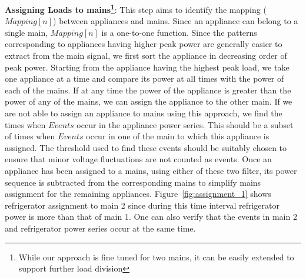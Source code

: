 \documentclass[conference]{IEEEtran}
\newcommand{\figref}[1]{Figure~\ref{#1}}
\begin{document}
\noindent\textbf{Assigning Loads to mains\footnote{While our approach is fine tuned for two mains, it can be easily extended to support further load division}}:
This step aims to identify the mapping ($Mapping[n]$) between appliances and mains. Since an appliance can belong to a single main, $Mapping[n]$ is a one-to-one function. Since the patterns corresponding to appliances having higher peak power are generally easier to extract from the main signal, we first sort the appliance in decreasing order of peak power. Starting from the appliance having the highest peak load, we take one appliance at a time and compare its power at all times with the power of each of the mains. If at any time the power of the appliance is greater than the power of any of the mains, we can assign the appliance to the other main. If we are not able to assign an appliance to mains using this approach, we find the times when $Events$ occur in the appliance power series. This should be a subset of times when $Events$ occur in one of the main to which this appliance is assigned. The threshold used to find these events should be suitably chosen to ensure that minor voltage fluctuations are not counted as events. Once an appliance has been assigned to a mains, using either of these two filter, its power sequence is subtracted from the corresponding mains to simplify mains assignment for the remaining appliances. \figref{fig:assignment_1} shows refrigerator assignment to main 2 since during this time interval refrigerator power is more than that of main 1. One can also verify that the events in main 2 and refrigerator power series occur at the same time.
\end{document}
